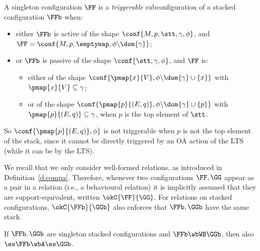 \begin{definition}
A singleton \AOGS configuration $\FF$ is 
a \emph{triggerable} subconfiguration of a stacked configuration $\FFb$ when:
\begin{itemize}
  \item either $\FFb$ is active of the shape
  $\conf{M,p,\stt,\gamma,\phi}$,
  and $\FF = \conf{M,p,\emptymap,\phi \backslash{\dom{\gamma}}}$;
  \item or $\FFb$ is passive of the shape
  $\conf{\stt,\gamma,\phi}$,
  and $\FF$ is:
  \begin{itemize}
    \item either of the shape
    $\conf{\pmap{x}{V},\phi \backslash{\dom{\gamma}} \cup\{x\}}$
    with $\pmap{x}{V} \subseteq \gamma$;
    \item or of the shape $\conf{\pmap{p}{(E,q)},\phi \backslash{\dom{\gamma}} \cup\{p\}}$
    with $\pmap{p}{(E,q)} \subseteq \gamma$,
    when $p$ is the top element of $\stt$.
  \end{itemize}
\end{itemize}
\end{definition}
\noindent
So
$\conf{\pmap{p}{(E,q)},\phi}$ is not triggerable 
when $p$ is not the top element of the stack,
since it cannot be directly triggered by an OA action of the \WBOGS LTS
(while it can be by the \AOGS LTS).

We recall that we only consider well-formed relations, 
as introduced in Definition~\ref{d:compa}.
Therefore, whenever two configurations $\FF,\GG$ appear as
a pair in a relation (i.e., a behavioural relation) 
it is implicitly assumed that they are support-equivalent, written
$\okC{\FF}{\GG}$.
For relations on stacked configurations, $\okC{\FFb}{\GGb}$ 
also enforces that $\FFb,\GGb$ have the same stack.

\begin{lemma}
\label{l:AOGS_WBOGS}
If $\FFb, \GGb$ are singleton stacked configurations and 
$\FFb \wbWB \GGb$, then also $\es\FFb \wbA \es\GGb$. 
\end{lemma}

